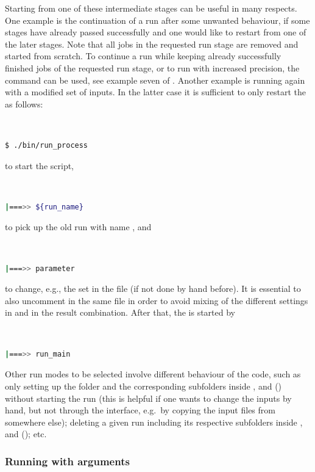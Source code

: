 \documentclass[english,11pt]{article}
\begin{document}
Starting from one of these intermediate stages can be useful in many respects. One example is 
the continuation of a run after some unwanted behaviour, if some stages have already 
passed successfully and one would like to restart from one of the later stages. 
Note that all jobs in the requested run stage are removed and started from
scratch. To continue a run while keeping already successfully finished jobs 
of the requested run stage, or to run with increased precision, the 
 command can be used, see example seven of .
Another example is running again with a modified set of inputs.
In the latter case it is sufficient to only restart the \mainrun{} as follows:
\lstset{basicstyle=\small}
{\tt
\begin{lstlisting}[language=bash]
 $ ./bin/run_process
\end{lstlisting}
}%
to start the script,
{\tt
\begin{lstlisting}[language=bash]
 |===>> ${run_name}
\end{lstlisting}
}
to pick up the old run with name , and
{\tt
\begin{lstlisting}[language=bash]
 |===>> parameter
\end{lstlisting}
}
to change, e.g., the \pdf{} set in the file 
 (if not done by hand before).
It is essential to also uncomment  in the same file
in order to avoid mixing of the different settings in \premainrun{} and \mainrun{} in the result 
combination.
After that, the \mainrun{} is started by
{\tt
\begin{lstlisting}[language=bash]
 |===>> run_main
\end{lstlisting}
}

Other run modes to be selected involve different behaviour of the code, such as only setting up the folder  and the corresponding subfolders inside ,  and  ()
without starting the run (this is helpful if one wants to change the inputs by hand, but not through the interface, e.g.\ by 
copying the input files from somewhere else); deleting a given run including its respective 
subfolders inside ,  and  (); etc.


\subsubsection{Running with arguments}\label{sec:arg}
\end{document}
